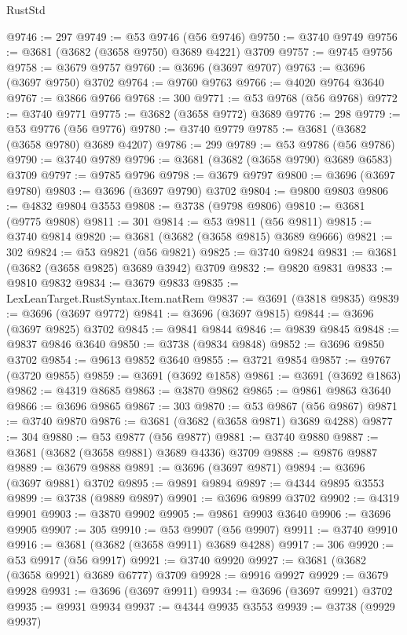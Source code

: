\begin{lexlean}{RustStd}
\begin{coremodule}
@9746 := 297
@9749 := @53 @9746 (@56 @9746)
@9750 := @3740 @9749
@9756 := @3681 (@3682 (@3658 @9750) @3689 @4221) @3709
@9757 := @9745 @9756
@9758 := @3679 @9757
@9760 := @3696 (@3697 @9707)
@9763 := @3696 (@3697 @9750) @3702
@9764 := @9760 @9763
@9766 := @4020 @9764 @3640
@9767 := @3866 @9766
@9768 := 300
@9771 := @53 @9768 (@56 @9768)
@9772 := @3740 @9771
@9775 := @3682 (@3658 @9772) @3689
@9776 := 298
@9779 := @53 @9776 (@56 @9776)
@9780 := @3740 @9779
@9785 := @3681 (@3682 (@3658 @9780) @3689 @4207)
@9786 := 299
@9789 := @53 @9786 (@56 @9786)
@9790 := @3740 @9789
@9796 := @3681 (@3682 (@3658 @9790) @3689 @6583) @3709
@9797 := @9785 @9796
@9798 := @3679 @9797
@9800 := @3696 (@3697 @9780)
@9803 := @3696 (@3697 @9790) @3702
@9804 := @9800 @9803
@9806 := @4832 @9804 @3553
@9808 := @3738 (@9798 @9806)
@9810 := @3681 (@9775 @9808)
@9811 := 301
@9814 := @53 @9811 (@56 @9811)
@9815 := @3740 @9814
@9820 := @3681 (@3682 (@3658 @9815) @3689 @9666)
@9821 := 302
@9824 := @53 @9821 (@56 @9821)
@9825 := @3740 @9824
@9831 := @3681 (@3682 (@3658 @9825) @3689 @3942) @3709
@9832 := @9820 @9831
@9833 := @9810 @9832
@9834 := @3679 @9833
@9835 := LexLeanTarget.RustSyntax.Item.natRem
@9837 := @3691 (@3818 @9835)
@9839 := @3696 (@3697 @9772)
@9841 := @3696 (@3697 @9815)
@9844 := @3696 (@3697 @9825) @3702
@9845 := @9841 @9844
@9846 := @9839 @9845
@9848 := @9837 @9846 @3640
@9850 := @3738 (@9834 @9848)
@9852 := @3696 @9850 @3702
@9854 := @9613 @9852 @3640
@9855 := @3721 @9854
@9857 := @9767 (@3720 @9855)
@9859 := @3691 (@3692 @1858)
@9861 := @3691 (@3692 @1863)
@9862 := @4319 @8685
@9863 := @3870 @9862
@9865 := @9861 @9863 @3640
@9866 := @3696 @9865
@9867 := 303
@9870 := @53 @9867 (@56 @9867)
@9871 := @3740 @9870
@9876 := @3681 (@3682 (@3658 @9871) @3689 @4288)
@9877 := 304
@9880 := @53 @9877 (@56 @9877)
@9881 := @3740 @9880
@9887 := @3681 (@3682 (@3658 @9881) @3689 @4336) @3709
@9888 := @9876 @9887
@9889 := @3679 @9888
@9891 := @3696 (@3697 @9871)
@9894 := @3696 (@3697 @9881) @3702
@9895 := @9891 @9894
@9897 := @4344 @9895 @3553
@9899 := @3738 (@9889 @9897)
@9901 := @3696 @9899 @3702
@9902 := @4319 @9901
@9903 := @3870 @9902
@9905 := @9861 @9903 @3640
@9906 := @3696 @9905
@9907 := 305
@9910 := @53 @9907 (@56 @9907)
@9911 := @3740 @9910
@9916 := @3681 (@3682 (@3658 @9911) @3689 @4288)
@9917 := 306
@9920 := @53 @9917 (@56 @9917)
@9921 := @3740 @9920
@9927 := @3681 (@3682 (@3658 @9921) @3689 @6777) @3709
@9928 := @9916 @9927
@9929 := @3679 @9928
@9931 := @3696 (@3697 @9911)
@9934 := @3696 (@3697 @9921) @3702
@9935 := @9931 @9934
@9937 := @4344 @9935 @3553
@9939 := @3738 (@9929 @9937)

\end{coremodule}
\end{lexlean}
